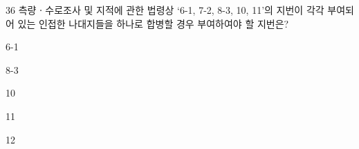 \begin{question}{36}
측량ㆍ수로조사 및 지적에 관한 법령상 ‘6-1, 7-2, 8-3, 10, 11’의 지번이 각각 부여되어 있는 인접한 나대지들을 하나로 합병할 경우 부여하여야 할 지번은?
\begin{choices}
  \item 6-1
  \item 8-3
  \item 10
  \item 11
  \item 12
\end{choices}
\end{question}

